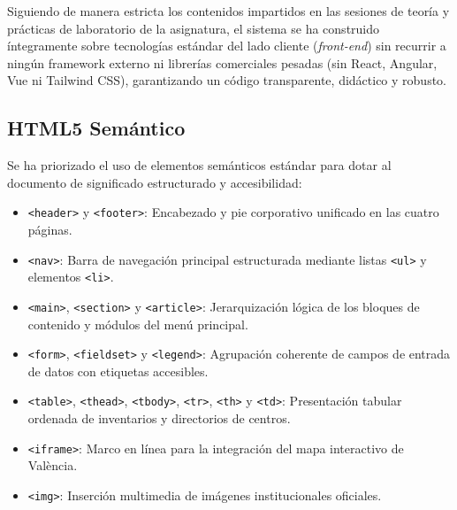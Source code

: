 \documentclass[11pt,a4paper]{article}
\begin{document}
Siguiendo de manera estricta los contenidos impartidos en las sesiones de teoría y prácticas de laboratorio de la asignatura, el sistema se ha construido íntegramente sobre tecnologías estándar del lado cliente (\textit{front-end}) sin recurrir a ningún framework externo ni librerías comerciales pesadas (sin React, Angular, Vue ni Tailwind CSS), garantizando un código transparente, didáctico y robusto.

\subsection{HTML5 Semántico}
Se ha priorizado el uso de elementos semánticos estándar para dotar al documento de significado estructurado y accesibilidad:
\begin{itemize}
    \item \texttt{<header>} y \texttt{<footer>}: Encabezado y pie corporativo unificado en las cuatro páginas.
    \item \texttt{<nav>}: Barra de navegación principal estructurada mediante listas \texttt{<ul>} y elementos \texttt{<li>}.
    \item \texttt{<main>}, \texttt{<section>} y \texttt{<article>}: Jerarquización lógica de los bloques de contenido y módulos del menú principal.
    \item \texttt{<form>}, \texttt{<fieldset>} y \texttt{<legend>}: Agrupación coherente de campos de entrada de datos con etiquetas accesibles.
    \item \texttt{<table>}, \texttt{<thead>}, \texttt{<tbody>}, \texttt{<tr>}, \texttt{<th>} y \texttt{<td>}: Presentación tabular ordenada de inventarios y directorios de centros.
    \item \texttt{<iframe>}: Marco en línea para la integración del mapa interactivo de València.
    \item \texttt{<img>}: Inserción multimedia de imágenes institucionales oficiales.
\end{itemize}
\end{document}
